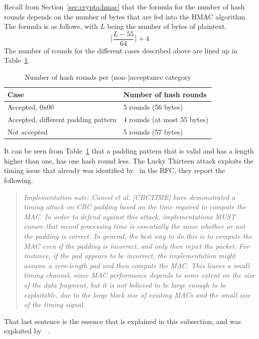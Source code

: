 \documentclass[10pt,conference,a4paper]{IEEEtran}
\begin{document}
Recall from Section~\ref{sec:crypto:hmac} that the formula for the number of hash rounds depends on the number of bytes that are fed into the HMAC algorithm. The formula is as follows, with $L$ being the number of bytes of plaintext.
\[ \lceil \frac{L - 55}{64} \rceil + 4 \]
The number of rounds for the different cases described above are lined up in Table~\ref{sec:lucky:bandit:table}.
\begin{table}[h]
\begin{tabular}{l|l}
Case & Number of hash rounds  \\ \hline 
Accepted, $0\text{x}00$ & 5 rounds (56 bytes)  \\
Accepted, different padding pattern & 4 rounds (at most 55 bytes)  \\
Not accepted & 5 rounds (57 bytes) \\
\end{tabular}
\caption{Number of hash rounds per (non-)acceptance category}
\label{sec:lucky:bandit:table}
\end{table}
It can be seen from Table~\ref{sec:lucky:bandit:table} that a padding pattern that is valid and has a length higher than one, has one hash round less. The Lucky Thirteen attack exploits the timing issue that already was identified by~\citeauthor{ietf2008transport} in the RFC, they report the following.
\begin{quote}
\textit{Implementation note: Canvel et al. [CBCTIME] have demonstrated a timing attack on CBC padding based on the time required to compute the MAC.  In order to defend against this attack, implementations MUST ensure that record processing time is essentially the same whether or not the padding is correct.  In general, the best way to do this is to compute the MAC even if the padding is incorrect, and only then reject the packet.  For instance, if the pad appears to be incorrect, the implementation might assume a zero-length pad and then compute the MAC.  This leaves a small timing channel, since MAC performance depends to some extent on the size of the data fragment, but it is not believed to be large enough to be exploitable, due to the large block size of existing MACs and the small size of the timing signal.}
\end{quote}
That last sentence is the essence that is explained in this subsection, and was exploited by~\citeauthor{alfardan2013lucky}~\cite{alfardan2013lucky}.

\end{document}

